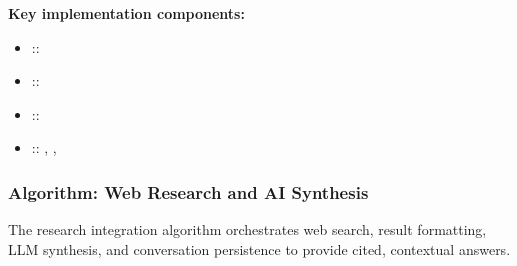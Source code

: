 \textbf{Key implementation components:}
{\small
\begin{itemize}
    \item \texttt{} :: \texttt{}
    \item \texttt{} :: \texttt{}
    \item \texttt{} :: \texttt{}
    \item \texttt{} :: \texttt{}, \texttt{}, \texttt{}
\end{itemize}
}

\subsubsection{Algorithm: Web Research and AI Synthesis}

The research integration algorithm orchestrates web search, result formatting, LLM synthesis, and conversation persistence to provide cited, contextual answers.

